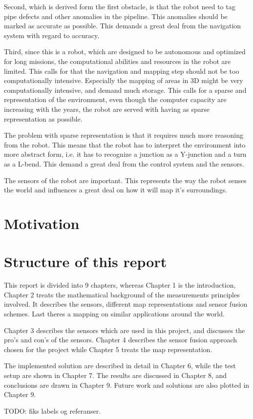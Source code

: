 Second, which is derived form the first obstacle, is that the robot need to tag pipe
defects and other anomalies in the pipeline. This anomalies should be marked as accurate
as possible. This demands a great deal from the navigation system with regard to accuracy. 

Third, since this is a robot, which are designed to be autonomous and optimized for long
missions, the computational abilities and resources in the robot are limited. This calls
for that the navigation and mapping step should not be too computationally intensive.
Especially the mapping of areas in 3D might be very computationally intensive, and demand
much storage. This calls for a sparse and representation of the environment, even though
the computer capacity are increasing with the years, the robot are served with having as
sparse representation as possible. 

The problem with sparse representation is that it requires much more reasoning from the 
robot. This means that the robot has to interpret the environment into more abstract form,
i.e. it has to recognize a junction as a Y-junction and a turn as a L-bend. This demand a
great deal from the control system and the sensors. 

The sensors of the robot are important. This represents the way the robot senses the world
and influences a great deal on how it will map it's surroundings. 


\section{Motivation}



\section{Structure of this report}
This report is divided into 9 chapters, whereas Chapter 1 is the introduction, Chapter 2
treats the mathematical background of the measurements principles involved. It describes
the sensors, different map representations and sensor fusion schemes. Last theres a
mapping on similar applications around the world.

Chapter 3 describes the sensors which are used in this project, and discusses the pro's
and con's of the sensors. Chapter 4 describes the sensor fusion approach chosen for the
project while Chapter 5 treats the map representation. 

The implemented solution are described in detail in Chapter 6, while the test setup are
shown in Chapter 7. The results are discussed in Chapter 8, and conclusions are drawn in
Chapter 9. Future work and solutions are also plotted in Chapter 9.

TODO: fiks labels og referanser. 


